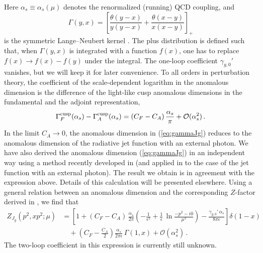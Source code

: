 \documentclass[12pt]{article}
\numberwithin{equation}{section}
\begin{document}
Here $\alpha_s\equiv\alpha_s(\mu)$ denotes the renormalized (running) QCD coupling, and 
\begin{equation}
   \Gamma(y,x) = \left[ \frac{\theta(y-x)}{y(y-x)} + \frac{\theta(x-y)}{x(x-y)} \right]_+
\end{equation}
is the symmetric Lange--Neubert kernel \cite{Lange:2003ff}. The plus distribution is defined such that, when $\Gamma(y,x)$ is integrated with a function $f(x)$, one has to replace $f(x)\to f(x)-f(y)$ under the integral. The one-loop coefficient $\gamma_{g,0}'$ vanishes, but we will keep it for later convenience. To all orders in perturbation theory, the coefficient of the scale-dependent logarithm in the anomalous dimension is the difference of the light-like cusp anomalous dimensions in the fundamental and the adjoint representation,
\begin{equation}\label{DeltaGamma}
   \Gamma_F^{\rm cusp}(\alpha_s) - \Gamma_A^{\rm cusp}(\alpha_s) 
   = (C_F-C_A)\,\frac{\alpha_s}{\pi} + \mathcal{O}(\alpha_s^2) \,.
\end{equation}
In the limit $C_A\to 0$, the anomalous dimension in (\ref{eq:gammaJg}) reduces to the anomalous dimension of the radiative jet function with an external photon. We have also derived the anomalous dimension (\ref{eq:gammaJg}) in an independent way using a method recently developed in \cite{Bodwin:2021cpx} (and applied in \cite{Bodwin:2021epw} to the case of the jet function with an external photon). The result we obtain is in agreement with the expression above. Details of this calculation will be presented elsewhere. Using a general relation between an anomalous dimension and the corresponding $Z$-factor derived in \cite{Becher:2009qa}, we find that 
\begin{equation}\label{eq:ZJNLO}
\begin{aligned}
   Z_{J_g}(p^2,x p^2;\mu)
   &= \left[ 1 + (C_F-C_A) \,\frac{\alpha_s}{2\pi} \left( - \frac{1}{\epsilon^{2}}
    + \frac{1}{\epsilon}\,\ln\frac{-p^2-i0}{\mu^2} \right) 
    - \frac{\gamma_{g,0}'\,\alpha_s}{8\pi\epsilon} \right] \delta(1-x) \\
   &\quad + \left( C_F - \frac{C_A}{2} \right) \frac{\alpha_s}{2\pi\epsilon}\,\Gamma(1,x)
    + \mathcal{O}(\alpha_s^2) \,.
\end{aligned}
\end{equation}
The two-loop coefficient in this expression is currently still unknown.
\end{document}
